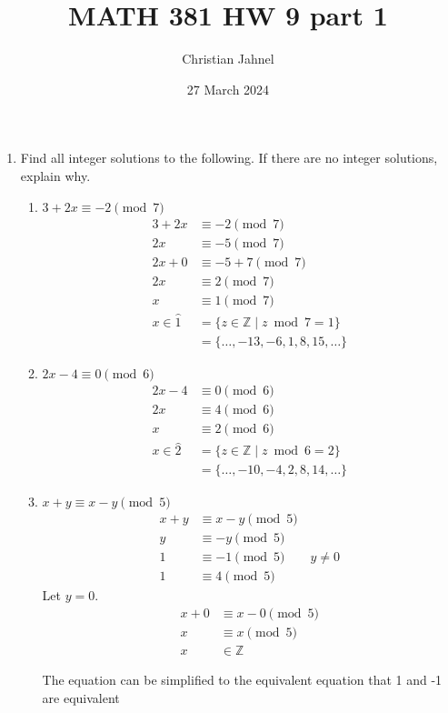 \documentclass[letterpaper, 12pt]{article}
\title{MATH 381 HW 9 part 1}
\author{Christian Jahnel}
\date{27 March 2024}
\newcommand{\Z}{\mathbb{Z}}
\newcommand{\0}{\emptyset}
\begin{document}
\maketitle
\begin{enumerate}
    \item Find all integer solutions to the following. If there are no integer solutions, explain why.
    \begin{enumerate}
    \item $3 + 2x \equiv -2 \pmod 7$
    \begin{align*}
        3 + 2x &\equiv -2 \pmod 7 \\
        2x &\equiv -5 \pmod 7 \\
        2x + 0 &\equiv -5 + 7 \pmod 7 \\
        2x &\equiv 2 \pmod 7 \\
        x &\equiv 1 \pmod 7 \\
        x \in \hat{1} &= \{z \in \Z \mid z \bmod 7 = 1\} \\
        &= \{\dots, -13, -6, 1, 8, 15, \dots\}
    \end{align*}
    \item $2x - 4 \equiv 0 \pmod 6$
    \begin{align*}
        2x - 4 &\equiv 0 \pmod 6 \\
        2x &\equiv 4 \pmod 6 \\
        x &\equiv 2 \pmod 6 \\
        x \in \hat{2} &= \{z \in \Z \mid z \bmod 6 = 2\} \\
        &= \{\dots, -10, -4, 2, 8, 14, \dots\}
    \end{align*}
    \item $x + y \equiv x - y \pmod 5$
    \begin{align*}
        x + y &\equiv x - y \pmod 5 \\
        y &\equiv -y \pmod 5 \\
        1 &\equiv -1 \pmod 5 \qquad y \ne 0\\
        1 &\equiv 4 \pmod 5
    \end{align*}
    Let $y = 0$.
    \begin{align*}
        x + 0 &\equiv x - 0 \pmod 5 \\
        x &\equiv x \pmod 5 \\
        x &\in \Z
    \end{align*}
    \begin{flushleft}
        The equation can be simplified to the equivalent equation that 1 and -1 are equivalent 

\end{flushleft}
\end{enumerate}
\end{enumerate}
\end{document}
